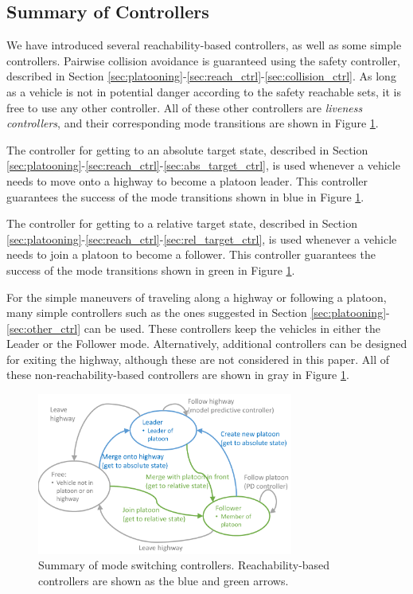 \subsection{Summary of Controllers}
We have introduced several reachability-based controllers, as well as some simple controllers. Pairwise collision avoidance is guaranteed using the safety controller, described in Section \ref{sec:platooning}-\ref{sec:reach_ctrl}-\ref{sec:collision_ctrl}. As long as a vehicle is not in potential danger according to the safety reachable sets, it is free to use any other controller. All of these other controllers are \textit{liveness controllers}, and their corresponding mode transitions are shown in Figure \ref{fig:modeControllers}.

The controller for getting to an absolute target state, described in Section \ref{sec:platooning}-\ref{sec:reach_ctrl}-\ref{sec:abs_target_ctrl}, is used whenever a vehicle needs to move onto a highway to become a platoon leader. This controller guarantees the success of the mode transitions shown in blue in Figure \ref{fig:modeControllers}.

The controller for getting to a relative target state, described in Section \ref{sec:platooning}-\ref{sec:reach_ctrl}-\ref{sec:rel_target_ctrl}, is used whenever a vehicle needs to join a platoon to become a follower. This controller guarantees the success of the mode transitions shown in green in Figure \ref{fig:modeControllers}.

For the simple maneuvers of traveling along a highway or following a platoon, many simple controllers such as the ones suggested in Section \ref{sec:platooning}-\ref{sec:other_ctrl} can be used. These controllers keep the vehicles in either the Leader or the Follower mode. Alternatively, additional controllers can be designed for exiting the highway, although these are not considered in this paper. All of these non-reachability-based controllers are shown in gray in Figure \ref{fig:modeControllers}.

\begin{figure}
	\centering
	\includegraphics[width=0.75\textwidth]{"fig/modeControllers"}
	\caption{Summary of mode switching controllers. Reachability-based controllers are shown as the blue and green arrows.}
	\label{fig:modeControllers}
\end{figure}